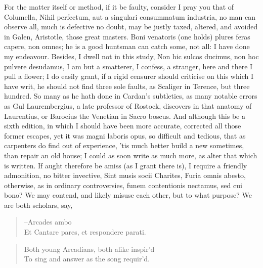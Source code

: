 {For the matter itself or method, if it be faulty, consider I pray you
that of Columella, Nihil perfectum, aut a singulari consummatum
industria, no man can observe all, much is defective no doubt, may be
justly taxed, altered, and avoided in Galen, Aristotle, those great
masters. Boni venatoris (one holds) plures feras capere, non
omnes; he is a good huntsman can catch some, not all: I have done my
endeavour. Besides, I dwell not in this study, Non hic sulcos ducimus,
non hoc pulvere desudamus, I am but a smatterer, I confess, a stranger,
here and there I pull a flower; I do easily grant, if a rigid
censurer should criticise on this which I have writ, he should not find
three sole faults, as Scaliger in Terence, but three hundred. So many
as he hath done in Cardan's subtleties, as many notable errors as
Gul Laurembergius, a late professor of Rostock, discovers in that
anatomy of Laurentius, or Barocius the Venetian in Sacro boscus. And
although this be a sixth edition, in which I should have been more
accurate, corrected all those former escapes, yet it was magni laboris
opus, so difficult and tedious, that as carpenters do find out of
experience, 'tis much better build a new sometimes, than repair an old
house; I could as soon write as much more, as alter that which is
written. If aught therefore be amiss (as I grant there is), I require a
friendly admonition, no bitter invective, Sint musis socii
Charites, Furia omnis abesto, otherwise, as in ordinary controversies,
funem contentionis nectamus, sed cui bono? We may contend, and likely
misuse each other, but to what purpose? We are both scholars, say,

\begin{verse}
--\textlatin{Arcades ambo}\\
\textlatin{Et Cantare pares, et respondere parati.}
\end{verse}

\begin{verse}
Both young Arcadians, both alike inspir'd\\
To sing and answer as the song requir'd.
\end{verse}

}
